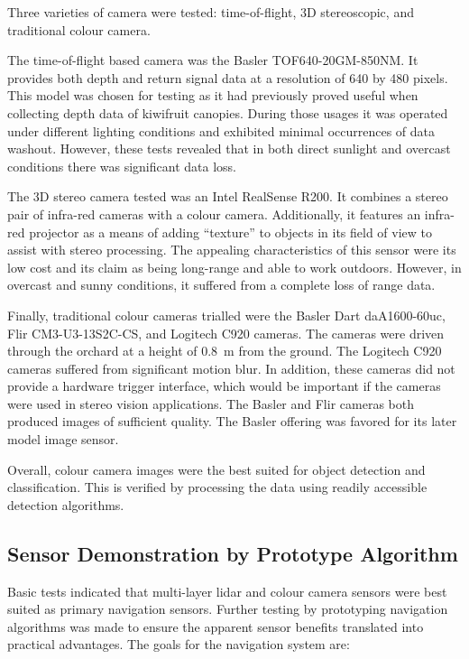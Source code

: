 \documentclass[preprint,authoryear,12pt]{elsarticle}
\begin{document}
        Three varieties of camera were tested: time-of-flight, 3D stereoscopic, and traditional colour camera.

        The time-of-flight based camera was the Basler TOF640-20GM-850NM.
        It provides both depth and return signal data at a resolution of 640 by 480 pixels.
        This model was chosen for testing as it had previously proved useful when collecting depth data of kiwifruit canopies.
        During those usages it was operated under different lighting conditions and exhibited minimal occurrences of data washout.
        However, these tests revealed that in both direct sunlight and overcast conditions there was significant data loss.

        The 3D stereo camera tested was an Intel RealSense R200.
        It combines a stereo pair of infra-red cameras with a colour camera.
        Additionally, it features an infra-red projector as a means of adding ``texture'' to objects in its field of view to assist with stereo processing.
        The appealing characteristics of this sensor were its low cost and its claim as being long-range and able to work outdoors.
        However, in overcast and sunny conditions, it suffered from a complete loss of range data.

        Finally, traditional colour cameras trialled were the Basler Dart daA1600-60uc, Flir CM3-U3-13S2C-CS, and Logitech C920 cameras.
        The cameras were driven through the orchard at a height of \SI{0.8}{\meter} from the ground.
        The Logitech C920 cameras suffered from significant motion blur.
        In addition, these cameras did not provide a hardware trigger interface, which would be important if the cameras were used in stereo vision applications.
        The Basler and Flir cameras both produced images of sufficient quality.
        The Basler offering was favored for its later model image sensor.

        Overall, colour camera images were the best suited for object detection and classification.
        This is verified by processing the data using readily accessible detection algorithms.

\subsection{Sensor Demonstration by Prototype Algorithm}

    Basic tests indicated that multi-layer lidar and colour camera sensors were best suited as primary navigation sensors.
    Further testing by prototyping navigation algorithms was made to ensure the apparent sensor benefits translated into practical advantages.
    The goals for the navigation system are:
\end{document}
